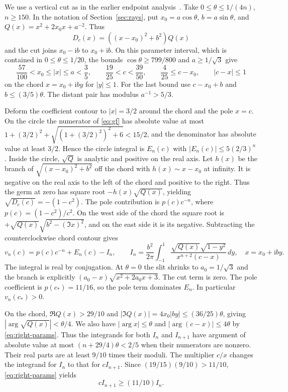 \documentclass[11pt]{article}
\newcommand{\ii}{\mathrm i}
\begin{document}
We use a vertical cut as in the earlier endpoint analysis~\cite[\S4]{eventual}. Take \(0\le\theta\le1/(4n)\), \(n\ge150\). In the notation of Section~\ref{sec:rays}, put \(x_0=a\cos\theta\), \(b=a\sin\theta\), and \(Q(x)=x^2+2x_0x+a^{-2}\). Thus
\[
D_c(x)=((x-x_0)^2+b^2)Q(x)
\]
and the cut joins \(x_0-\ii b\) to \(x_0+\ii b\). On this parameter interval, which is contained in \(0\le\theta\le1/20\), the bounds \(\cos\theta\ge799/800\) and \(a\ge1/\sqrt3\) give
\begin{equation}\label{eq:right-params}
\frac{57}{100}<x_0\le|x|\le a<\frac35,\qquad
\frac{19}{25}<c<\frac{39}{50},\qquad
\frac4{25}\le c-x_0,\qquad |c-x|\le1
\end{equation}
on the chord \(x=x_0+\ii by\) for \(|y|\le1\). For the last bound use \(c-x_0+b\) and \(b\le(3/5)\theta\). The distant pair has modulus \(a^{-1}>5/3\).

Deform the coefficient contour to \(|x|=3/2\) around the chord and the pole \(x=c\). On the circle the numerator of \eqref{eq:gf} has absolute value at most \(1+(3/2)^2+\sqrt{(1+(3/2)^2)^2+6}<15/2\), and the denominator has absolute value at least \(3/2\). Hence the circle integral is \(E_n(c)\) with \(|E_n(c)|\le5(2/3)^n\). Inside the circle, \(\sqrt{Q}\) is analytic and positive on the real axis. Let \(h(x)\) be the branch of \(\sqrt{(x-x_0)^2+b^2}\) off the chord with \(h(x)\sim x-x_0\) at infinity. It is negative on the real axis to the left of the chord and positive to the right. Thus the germ at zero has square root \(-h(x)\sqrt{Q(x)}\), yielding \(\sqrt{D_c(c)}=-(1-c^2)\). The pole contribution is \(p(c)c^{-n}\), where \(p(c)=(1-c^2)/c^2\). On the west side of the chord the square root is \(+\sqrt{Q(x)}\sqrt{b^2-(\Im x)^2}\), and on the east side it is its negative. Subtracting the counterclockwise chord contour gives
\begin{equation}\label{eq:vertical}
v_n(c)=p(c)c^{-n}+E_n(c)-I_n,\qquad
I_n=\frac{b^2}{2\pi}\int_{-1}^{1}
\frac{\sqrt{Q(x)}\sqrt{1-y^2}}{x^{n+2}(c-x)}\,dy,\quad x=x_0+\ii by.
\end{equation}
The integral is real by conjugation. At \(\theta=0\) the slit shrinks to \(a_0=1/\sqrt3\) and the branch is explicitly \((a_0-x)\sqrt{x^2+2a_0x+3}\). The cut term is zero. The pole coefficient is \(p(c_*)=11/16\), so the pole term dominates \(E_n\). In particular \(v_n(c_*)>0\).

On the chord, \(\Re Q(x)>29/10\) and \(|\Im Q(x)|=4x_0|by|\le(36/25)\theta\), giving \(|\arg\sqrt{Q(x)}|<\theta/4\). We also have \(|\arg x|\le\theta\) and \(|\arg(c-x)|\le4\theta\) by \eqref{eq:right-params}. Thus the integrands for both \(I_n\) and \(I_{n+1}\) have argument of absolute value at most \((n+29/4)\theta<2/5\) when their numerators are nonzero. Their real parts are at least \(9/10\) times their moduli. The multiplier \(c/x\) changes the integrand for \(I_n\) to that for \(c I_{n+1}\). Since \((19/15)(9/10)>11/10\), \eqref{eq:right-params} yields
\begin{equation}\label{eq:vertical-compare}
c I_{n+1}\ge(11/10) I_n.
\end{equation}
\end{document}
